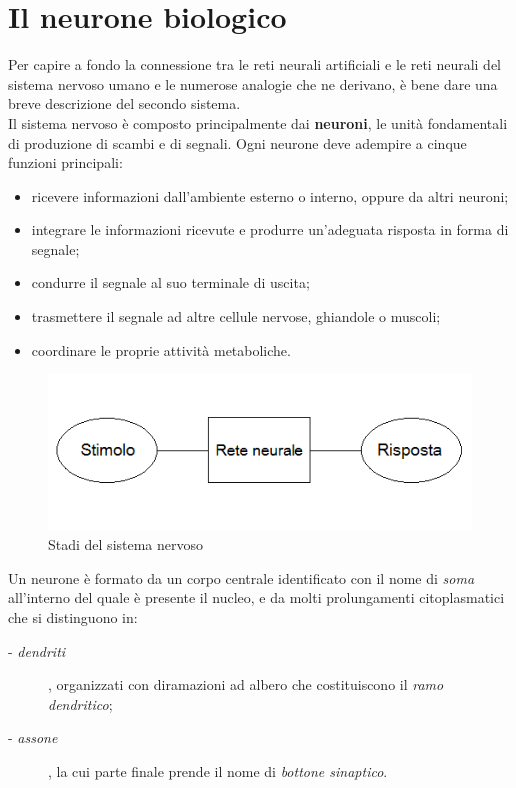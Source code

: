 \documentclass[12pt,a4paper,oneside]{book}
\begin{document}
		
	\section{Il neurone biologico}
		
		Per capire a fondo la connessione tra le reti neurali artificiali e le reti neurali del sistema nervoso umano e le numerose analogie che ne derivano, è bene dare una breve descrizione del secondo sistema.\\
  		Il sistema nervoso è composto principalmente dai \textbf{neuroni}, le unità fondamentali di produzione di scambi e di segnali. Ogni neurone deve adempire a cinque funzioni principali:
  		
  		\begin{itemize}
  			\item ricevere informazioni dall'ambiente esterno o interno, oppure da altri neuroni;
  			\item integrare le informazioni ricevute e produrre un'adeguata risposta in forma di segnale;
  			\item condurre il segnale al suo terminale di uscita;
  			\item trasmettere il segnale ad altre cellule nervose, ghiandole o muscoli;
  			\item coordinare le proprie attività metaboliche.
  		\end{itemize}
  	
  		\begin{figure}[h]
  			\centering
  			\includegraphics[width=0.6\linewidth]{IMMAGINI/Sistemanervoso}
  			\caption{Stadi del sistema nervoso}
  			\label{fig: stadi sistema nervoso}
  		\end{figure}
		
		Un neurone è formato da un corpo centrale identificato con il nome di \emph{soma} all'interno del quale è presente il nucleo, e da molti prolungamenti citoplasmatici che si distinguono in:
		 
		 \begin{description}
		 	\item[- \emph{dendriti}], organizzati con diramazioni ad albero che costituiscono il \emph{ramo dendritico};
		 	\item [- \emph{assone}], la cui parte finale prende il nome di \emph{bottone sinaptico}.
		 \end{description}
		 
\end{document}

